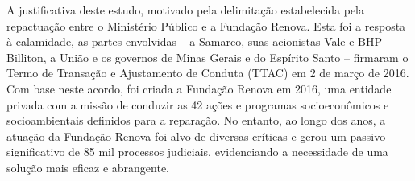 \hspace*{1.25 cm}  A justificativa deste estudo, motivado pela delimitação estabelecida pela repactuação entre o Ministério Público e a Fundação Renova. Esta foi a resposta à calamidade, as partes envolvidas – a Samarco, suas acionistas Vale e BHP Billiton, a União e os governos de Minas Gerais e do Espírito Santo – firmaram o Termo de Transação e Ajustamento de Conduta (TTAC) em 2 de março de 2016. Com base neste acordo, foi criada a Fundação Renova em 2016, uma entidade privada com a missão de conduzir as 42 ações e programas socioeconômicos e socioambientais definidos para a reparação. No entanto, ao longo dos anos, a atuação da Fundação Renova foi alvo de diversas críticas e gerou um passivo significativo de 85 mil processos judiciais, evidenciando a necessidade de uma solução mais eficaz e abrangente.
%

